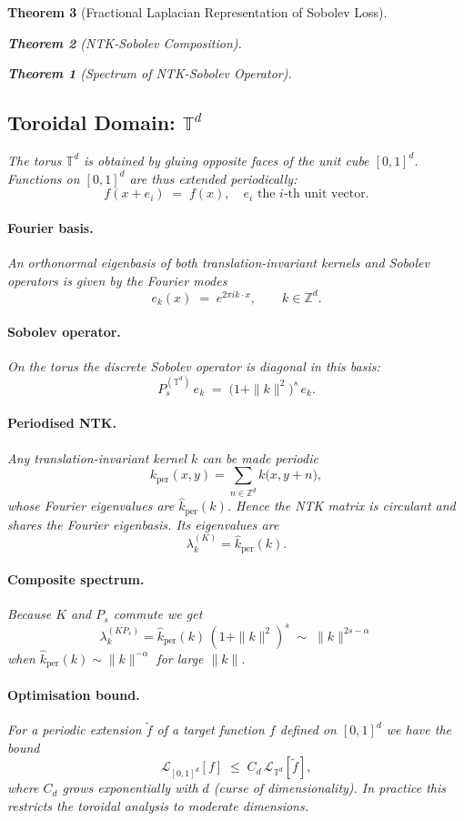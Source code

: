 \documentclass{article}
\newtheorem{theorem}{Theorem}[section]
\begin{document}
\begin{theorem}[Fractional Laplacian Representation of Sobolev Loss]
\begin{theorem}[NTK-Sobolev Composition]
\begin{theorem}[Spectrum of NTK-Sobolev Operator]
\subsection{Toroidal Domain: $\mathbb{T}^d$}

The torus $\mathbb{T}^d$ is obtained by gluing opposite faces of the unit cube $[0,1]^d$.  Functions on $[0,1]^d$ are thus extended periodically:
\[
  f(x+e_i) \;=\; f(x), \quad e_i \text{ the } i\text{-th unit vector.}
\]

\paragraph{Fourier basis.}  An orthonormal eigenbasis of both translation-invariant kernels and Sobolev operators is given by the Fourier modes
\[
   e_k(x) \;=\; e^{2\pi i k\cdot x}, \qquad k\in\mathbb Z^d.
\]

\paragraph{Sobolev operator.}  On the torus the discrete Sobolev operator is diagonal in this basis:
\[
   P_s^{(\mathbb{T}^d)}\,e_k\;=\;\bigl(1+\|k\|^2\bigr)^{s}\,e_k.
\]

\paragraph{Periodised NTK.}  Any translation-invariant kernel $k$ can be made periodic
\[
   k_{\text{per}}(x,y)=\sum_{n\in\mathbb Z^d} k\bigl(x, y+n\bigr),
\]
whose Fourier eigenvalues are $\widehat{k}_{\text{per}}(k)$.  Hence the NTK matrix is circulant and shares the Fourier eigenbasis.  Its eigenvalues are
\[
   \lambda_k^{(K)}=\widehat{k}_{\text{per}}(k).
\]

\paragraph{Composite spectrum.}  Because $K$ and $P_s$ commute we get
\[
   \lambda_k^{(KP_s)} = \widehat{k}_{\text{per}}(k)\,(1+\|k\|^2)^{s}
   \;\sim\; \|k\|^{2s-\alpha}
\]
when $\widehat{k}_{\text{per}}(k)\sim\|k\|^{-\alpha}$ for large $\|k\|$.

\paragraph{Optimisation bound.}  For a periodic extension $\tilde f$ of a target function $f$ defined on $[0,1]^d$ we have the bound
\[
   \mathcal L_{[0,1]^d}[f]\;\le\; C_d\,\mathcal L_{\mathbb T^d}[\tilde f],
\]
where $C_d$ grows exponentially with $d$ (curse of dimensionality).  In practice this restricts the toroidal analysis to moderate dimensions.


\end{theorem}
\end{theorem}
\end{theorem}
\end{document}
